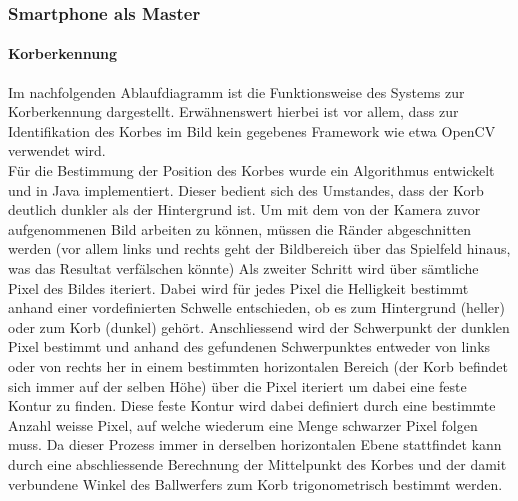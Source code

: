 \subsubsection{Smartphone als Master}
	
	
	\paragraph{Korberkennung}
	Im nachfolgenden Ablaufdiagramm ist die Funktionsweise des Systems zur Korberkennung dargestellt. Erwähnenswert hierbei ist vor allem, dass zur Identifikation des Korbes im Bild kein gegebenes Framework wie etwa OpenCV verwendet wird. \\
	Für die Bestimmung der Position des Korbes wurde ein Algorithmus entwickelt und in Java implementiert. Dieser bedient sich des Umstandes, dass der Korb deutlich dunkler als der Hintergrund ist. Um mit dem von der Kamera zuvor aufgenommenen Bild arbeiten zu können, müssen die Ränder abgeschnitten werden (vor allem links und rechts geht der Bildbereich über das Spielfeld hinaus, was das Resultat verfälschen könnte) Als zweiter Schritt wird über sämtliche Pixel des Bildes iteriert. Dabei wird für jedes Pixel die Helligkeit bestimmt anhand einer vordefinierten Schwelle entschieden, ob es zum Hintergrund (heller) oder zum Korb (dunkel) gehört. Anschliessend wird der Schwerpunkt der dunklen Pixel bestimmt und anhand des gefundenen Schwerpunktes entweder von links oder von rechts her in einem bestimmten horizontalen Bereich (der Korb befindet sich immer auf der selben Höhe) über die Pixel iteriert um dabei eine feste Kontur zu finden. Diese feste Kontur wird dabei definiert durch eine bestimmte Anzahl weisse Pixel, auf welche wiederum eine Menge schwarzer Pixel folgen muss. Da dieser Prozess immer in derselben horizontalen Ebene stattfindet kann durch eine abschliessende Berechnung der Mittelpunkt des Korbes und der damit verbundene Winkel des Ballwerfers zum Korb trigonometrisch bestimmt werden.\\
	